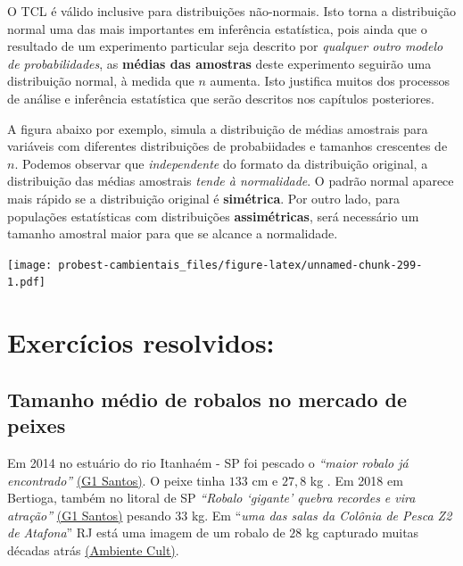\documentclass[
]{book}
\begin{document}
O TCL é válido inclusive para distribuições não-normais. Isto torna a distribuição normal uma das mais importantes em inferência estatística, pois ainda que o resultado de um experimento particular seja descrito por \emph{qualquer outro modelo de probabilidades}, as \textbf{médias das amostras} deste experimento seguirão uma distribuição normal, à medida que \(n\) aumenta. Isto justifica muitos dos processos de análise e inferência estatística que serão descritos nos capítulos posteriores.

A figura abaixo por exemplo, simula a distribuição de médias amostrais para variáveis com diferentes distribuições de probabiidades e tamanhos crescentes de \(n\). Podemos observar que \emph{independente} do formato da distribuição original, a distribuição das médias amostrais \emph{tende à normalidade}. O padrão normal aparece mais rápido se a distribuição original é \textbf{simétrica}. Por outro lado, para populações estatísticas com distribuições \textbf{assimétricas}, será necessário um tamanho amostral maior para que se alcance a normalidade.

\texttt{[image: probest-cambientais\_files/figure-latex/unnamed-chunk-299-1.pdf]}

\hypertarget{exercuxedcios-resolvidos-1}{%
\section{Exercícios resolvidos:}\label{exercuxedcios-resolvidos-1}}

\hypertarget{tamanho-muxe9dio-de-robalos-no-mercado-de-peixes}{%
\subsection{Tamanho médio de robalos no mercado de peixes}\label{tamanho-muxe9dio-de-robalos-no-mercado-de-peixes}}

Em 2014 no estuário do rio Itanhaém - SP foi pescado o \emph{``maior robalo já encontrado''} \href{http://g1.globo.com/sp/santos-regiao/noticia/2014/11/pescador-fisga-em-itanhaem-o-maior-robalo-ja-encontrado-briguei-com-ele.html}{(G1 Santos)}. O peixe tinha \(133\) cm e \(27,8\) kg . Em 2018 em Bertioga, também no litoral de SP \emph{``Robalo `gigante' quebra recordes e vira atração''} \href{https://g1.globo.com/sp/santos-regiao/noticia/robalo-gigante-quebra-recordes-e-vira-atracao-durante-pescaria-em-sp.ghtml}{(G1 Santos)} pesando \(33\) kg. Em ``\emph{uma das salas da Colônia de Pesca Z2 de Atafona}'' RJ está uma imagem de um robalo de \(28\) kg capturado muitas décadas atrás \href{http://ambientecult.blogspot.com/2010/10/ponto-de-memoria-foto-da-pesca.html}{(Ambiente Cult)}.
\end{document}
